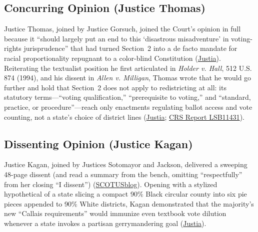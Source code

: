 \documentclass[12pt]{article}
\begin{document}
\subsection{Concurring Opinion (Justice Thomas)}

Justice Thomas, joined by Justice Gorsuch, joined the Court's opinion in full because it ``should largely put an end to this `disastrous misadventure' in voting-rights jurisprudence'' that had turned Section~2 into a de facto mandate for racial proportionality repugnant to a color-blind Constitution (\href{https://supreme.justia.com/cases/federal/us/608/24-109/}{Justia}). Reiterating the textualist position he first articulated in \textit{Holder v. Hall}, 512 U.S. 874 (1994), and his dissent in \textit{Allen v. Milligan}, Thomas wrote that he would go further and hold that Section~2 does not apply to redistricting at all: its statutory terms---``voting qualification,'' ``prerequisite to voting,'' and ``standard, practice, or procedure''---reach only enactments regulating ballot access and vote counting, not a state's choice of district lines (\href{https://supreme.justia.com/cases/federal/us/608/24-109/}{Justia}; \href{https://www.everycrsreport.com/reports/LSB11431.html}{CRS Report LSB11431}).

\subsection{Dissenting Opinion (Justice Kagan)}

Justice Kagan, joined by Justices Sotomayor and Jackson, delivered a sweeping 48-page dissent (and read a summary from the bench, omitting ``respectfully'' from her closing ``I dissent'') (\href{https://www.scotusblog.com/2026/04/in-major-voting-rights-act-case-supreme-court-strikes-down-redistricting-map-challenged-as-racia/}{SCOTUSblog}). Opening with a stylized hypothetical of a state slicing a compact 90\% Black circular county into six pie pieces appended to 90\% White districts, Kagan demonstrated that the majority's new ``Callais requirements'' would immunize even textbook vote dilution whenever a state invokes a partisan gerrymandering goal (\href{https://supreme.justia.com/cases/federal/us/608/24-109/}{Justia}).
\end{document}
